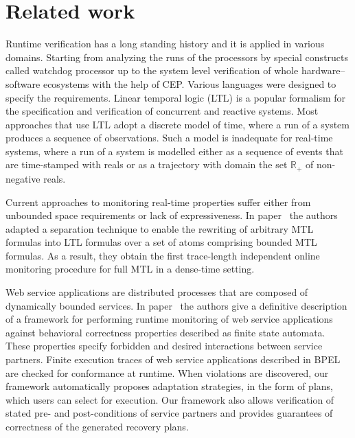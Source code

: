 \section{Related work}
Runtime verification has a long standing history and it is applied in various domains.
Starting from analyzing the runs of the processors by special constructs called watchdog processor up to the system level verification of whole hardware--software ecosystems with the help of CEP.
Various languages were designed to specify the requirements.
Linear temporal logic (LTL) is a popular formalism for the specification and
verification of concurrent and reactive systems\citep{pnueli1977temporal}.
Most approaches that use LTL adopt a discrete model of time, where a run of a system produces a sequence
of observations. Such a model is inadequate for real-time systems, where a run
of a system is modelled either as a sequence of events that are time-stamped
with reals or as a trajectory with domain the set $\mathbb{R}_+$ of non-negative reals\citep{nivckovic2010mtl}.

Current approaches to monitoring real-time properties suffer either from unbounded space requirements or lack of expressiveness. In paper~\citep{ho2014online} the authors adapted a separation technique to enable  the rewriting of arbitrary MTL formulas into LTL formulas over a set of atoms comprising bounded MTL formulas. As a result, they obtain the first trace-length independent online monitoring procedure for full MTL in a dense-time setting.

Web  service  applications  are  distributed  processes  that  are  composed  of  dynamically  bounded  services.  In paper~\citep{simmonds2013monitoring}  the authors  give  a  definitive description  of  a  framework  for  performing  runtime  monitoring  of  web  service applications against behavioral correctness properties described as finite	state  automata.  These  properties  specify  forbidden  and  desired  interactions	between service partners. Finite execution traces of web service applications described in BPEL are checked for conformance at runtime. When violations	are discovered, our framework automatically proposes adaptation strategies,	in the form of plans, which users can select for execution. Our framework also allows verification of stated pre- and post-conditions of service partners and provides guarantees of correctness of the generated recovery plans.

